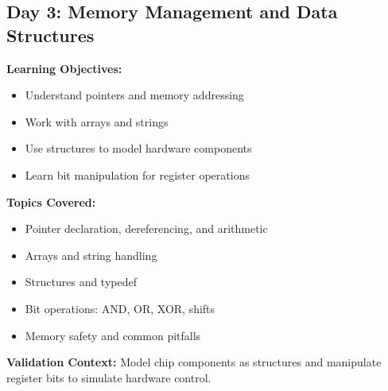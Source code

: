 \documentclass[11pt,a4paper]{article}
\begin{document}
\subsection{Day 3: Memory Management and Data Structures}

\textbf{Learning Objectives:}
\begin{itemize}
    \item Understand pointers and memory addressing
    \item Work with arrays and strings
    \item Use structures to model hardware components
    \item Learn bit manipulation for register operations
\end{itemize}

\textbf{Topics Covered:}
\begin{itemize}
    \item Pointer declaration, dereferencing, and arithmetic
    \item Arrays and string handling
    \item Structures and typedef
    \item Bit operations: AND, OR, XOR, shifts
    \item Memory safety and common pitfalls
\end{itemize}

\textbf{Validation Context:}
Model chip components as structures and manipulate register bits to simulate hardware control.
\end{document}
